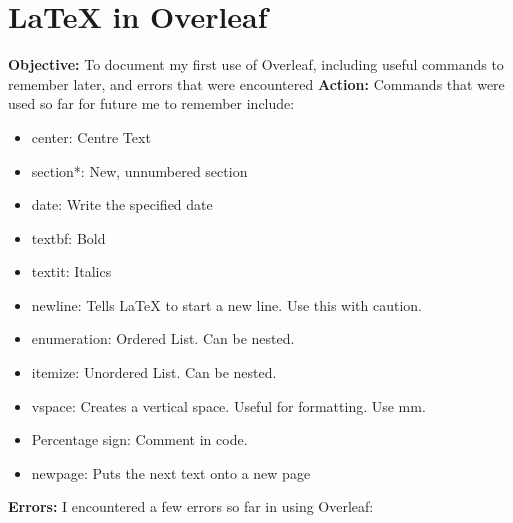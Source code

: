 \documentclass{article}
\begin{document}
\section{LaTeX in Overleaf}
\textbf{Objective:} To document my first use of Overleaf, including useful commands to remember later, and errors that were encountered
\newline
\textbf{Action:} Commands that were used so far for future me to remember include:
\begin{itemize}
    \item center: Centre Text
    \item section*: New, unnumbered section
    \item date: Write the specified date
    \item textbf: Bold
    \item textit: Italics
    \item newline: Tells LaTeX to start a new line. Use this with caution.
    \item enumeration: Ordered List. Can be nested.
    \item itemize: Unordered List. Can be nested.
    \item vspace: Creates a vertical space. Useful for formatting. Use mm.
    \item Percentage sign: Comment in code.
    \item newpage: Puts the next text onto a new page
\end{itemize}
\textbf{Errors:} I encountered a few errors so far in using Overleaf:
\end{document}
